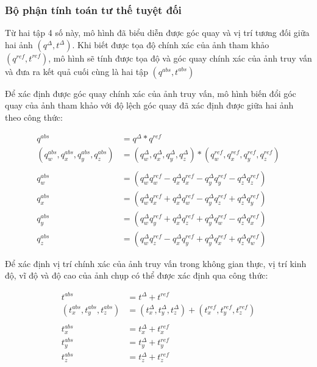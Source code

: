 \subsubsection{Bộ phận tính toán tư thế tuyệt đối}

Từ hai tập 4 số này, mô hình đã biểu diễn được góc quay và vị trí tương đối giữa hai ảnh $(q^{\Delta},t^{\Delta})$. Khi biết được tọa độ chính xác của ảnh tham khảo $(q^{ref},t^{ref})$, mô hình sẽ tính được tọa độ và góc quay chính xác của ảnh truy vấn và đưa ra kết quả cuối cùng là hai tập $(q^{abs},t^{abs})$

Để xác định được góc quay chính xác của ảnh truy vấn, mô hình biến đổi góc quay của ảnh tham khảo với độ lệch góc quay đã xác định được giữa hai ảnh theo công thức:

$$
  \begin{aligned}
    q^{abs}                                   & = q^{\Delta} * q^{ref}                                                                                    \\
    (q^{abs}_w,q^{abs}_x,q^{abs}_y,q^{abs}_z) & = (q^{\Delta}_w,q^{\Delta}_x,q^{\Delta}_y,q^{\Delta}_z) * (q^{ref}_w,q^{ref}_x,q^{ref}_y,q^{ref}_z)       \\ \\
    q^{abs}_w                                 & =\left(q^{\Delta}_w q^{ref}_w-q^{\Delta}_x q^{ref}_x-q^{\Delta}_y q^{ref}_y-q^{\Delta}_z q^{ref}_z\right) \\
    q^{abs}_x                                 & =\left(q^{\Delta}_w q^{ref}_x+q^{\Delta}_x q^{ref}_w-q^{\Delta}_y q^{ref}_z+q^{\Delta}_z q^{ref}_y\right) \\
    q^{abs}_y                                 & =\left(q^{\Delta}_w q^{ref}_y+q^{\Delta}_x q^{ref}_z+q^{\Delta}_y q^{ref}_w-q^{\Delta}_z q^{ref}_x\right) \\
    q^{abs}_z                                 & =\left(q^{\Delta}_w q^{ref}_z-q^{\Delta}_x q^{ref}_y+q^{\Delta}_y q^{ref}_x+q^{\Delta}_z q^{ref}_w\right)
  \end{aligned}
$$

Để xác định vị trí chính xác của ảnh truy vấn trong không gian thực, vị trí kinh độ, vĩ độ và độ cao của ảnh chụp có thể được xác định qua công thức:

$$
  \begin{aligned}
    t^{abs}                         & = t^{\Delta} + t^{ref}                                                       \\
    (t^{abs}_x,t^{abs}_y,t^{abs}_z) & = (t^{\Delta}_x,t^{\Delta}_y,t^{\Delta}_z) + (t^{ref}_x,t^{ref}_y,t^{ref}_z) \\ \\
    t^{abs}_x                       & = t^{\Delta}_x + t^{ref}_x                                                   \\
    t^{abs}_y                       & = t^{\Delta}_y + t^{ref}_y                                                   \\
    t^{abs}_z                       & = t^{\Delta}_z + t^{ref}_z                                                   \\
  \end{aligned}
$$

